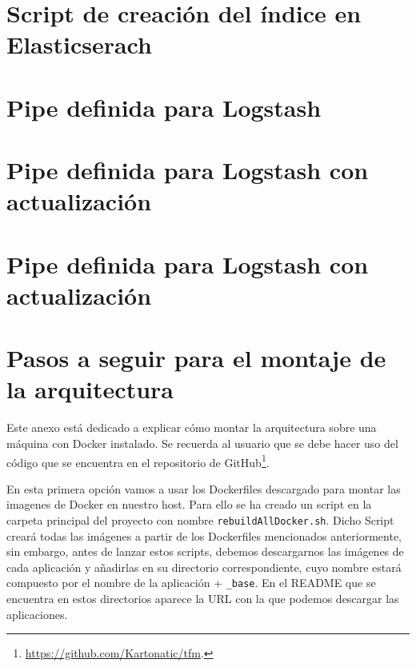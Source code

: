 \newpage
\chapter{Script de creación del índice en Elasticserach}\label{apendG}


\newpage
\chapter{Pipe definida para Logstash}\label{apendH}



\newpage

\chapter{Pipe definida para Logstash con actualización\label{apendI}}



\newpage
\chapter{Pipe definida para Logstash con actualización\label{apendJ}}




\newpage
\chapter{Pasos a seguir para el montaje de la arquitectura\label{apendK}}

Este anexo está dedicado a explicar cómo montar la arquitectura sobre una
máquina con Docker instalado. Se recuerda al usuario que se debe hacer
uso del código que se encuentra en el repositorio de
GitHub\footnote{\url{https://github.com/Kartonatic/tfm}.}.

En esta primera opción vamos a usar los Dockerfiles descargado 
para montar las imagenes de Docker en nuestro host. Para ello se
ha creado un script en la carpeta principal del proyecto
con nombre {\tt rebuildAllDocker.sh}. Dicho Script creará todas las
imágenes a partir de los Dockerfiles mencionados anteriormente, sin
embargo, antes de lanzar estos scripts, debemos descargarnos las imágenes
de cada aplicación y añadirlas en su directorio correspondiente, cuyo
nombre estará compuesto por el nombre de la aplicación + {\tt \_base}. En
el README que se encuentra en estos directorios aparece la URL con la que
podemos descargar las aplicaciones.

